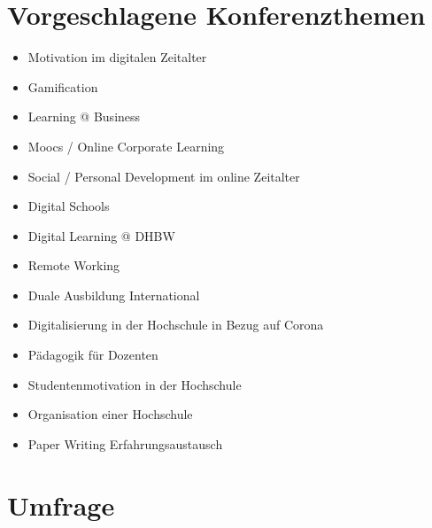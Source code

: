 \chapter{Vorgeschlagene Konferenzthemen}
\label{app:konferenzthemen}
\begin{itemize}
	\item Motivation im digitalen Zeitalter
	\item Gamification
	\item Learning @ Business
	\item Moocs / Online Corporate Learning
	\item Social / Personal Development im online Zeitalter
	\item Digital Schools
	\item Digital Learning @ DHBW
	\item Remote Working
	\item Duale Ausbildung International
	\item Digitalisierung in der Hochschule in Bezug auf Corona
	\item Pädagogik für Dozenten
	\item Studentenmotivation in der Hochschule
	\item Organisation einer Hochschule
	\item Paper Writing Erfahrungsaustausch
\end{itemize}

\chapter{Umfrage}